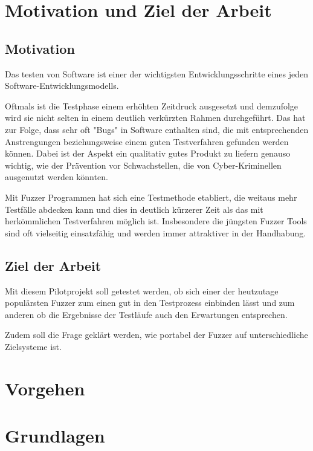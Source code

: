 \documentclass[12pt,a4paper]{scrreprt}
\begin{document}
\newpage
\chapter{ Motivation und Ziel der Arbeit  }

\section{Motivation}

Das testen von Software ist einer der wichtigsten Entwicklungsschritte eines jeden Software-Entwicklungsmodells. 

Oftmals ist die Testphase einem erhöhten Zeitdruck ausgesetzt und demzufolge wird sie nicht selten in einem deutlich verkürzten Rahmen durchgeführt.
Das hat zur Folge, dass sehr oft "Bugs" in Software enthalten sind, die mit entsprechenden Anstrengungen beziehungsweise einem guten Testverfahren gefunden werden können. Dabei ist der Aspekt ein qualitativ gutes Produkt zu liefern genauso wichtig, wie der Prävention vor Schwachstellen, die von Cyber-Kriminellen ausgenutzt werden könnten. 

Mit Fuzzer Programmen hat sich eine Testmethode etabliert, die weitaus mehr Testfälle abdecken kann und dies in deutlich kürzerer Zeit als das mit herkömmlichen Testverfahren möglich ist.
Insbesondere die jüngsten Fuzzer Tools sind oft vielseitig einsatzfähig und werden immer attraktiver in der Handhabung.


\section{Ziel der Arbeit}

Mit diesem Pilotprojekt soll getestet werden, ob sich einer der heutzutage populärsten Fuzzer zum einen gut in den Testprozess einbinden lässt und zum anderen ob die Ergebnisse der Testläufe auch den Erwartungen entsprechen.

Zudem soll die Frage geklärt werden, wie portabel der Fuzzer auf unterschiedliche Zielsysteme ist.


\chapter{Vorgehen}



\newpage
\chapter{Grundlagen} 
\end{document}
